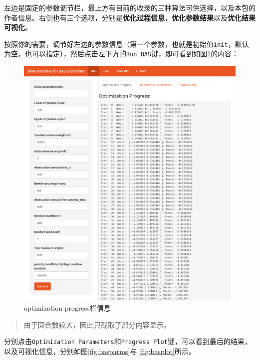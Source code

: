 \documentclass[]{ctexbook}
\begin{document}
左边是固定的参数调节栏，最上方有目前的收录的三种算法可供选择，以及本包的作者信息。右侧也有三个选项，分别是\textbf{优化过程信息}，\textbf{优化参数结果}以及\textbf{优化结果可视化}。

按照你的需要，调节好左边的参数信息（第一个参数，也就是初始值\texttt{init}，默认为空，也可以指定），然后点击左下方的\texttt{Run\ BAS}键，即可看到如图\ref{fig:basprogress}的内容：

\begin{figure}

{\centering \includegraphics[width=0.95\linewidth]{img/app2} 

}

\caption{optimization progress栏信息}\label{fig:basprogress}
\end{figure}

\begin{quote}
由于回合数较大，因此只截取了部分内容显示。
\end{quote}

分别点击\texttt{Optimization\ Parameters}和\texttt{Progress\ Plot}键，可以看到最后的结果，以及可视化信息，分别如图\ref{fig:basparms}与
\ref{fig:basplot}所示。
\end{document}
